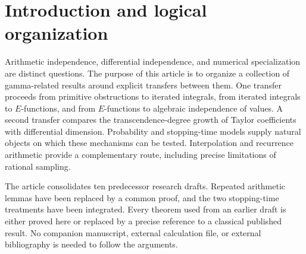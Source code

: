 \documentclass[11pt,a4paper]{article}
\theoremstyle{definition}
\theoremstyle{remark}
\numberwithin{equation}{section}
\begin{document}
\section{Introduction and logical organization}
\label{unified:introduction}
Arithmetic independence, differential independence, and numerical
specialization are distinct questions. The purpose of this article is
to organize a collection of gamma-related results around explicit
transfers between them. One transfer proceeds from primitive
obstructions to iterated integrals, from iterated integrals to
$E$-functions, and from $E$-functions to algebraic independence of
values. A second transfer compares the transcendence-degree growth of
Taylor coefficients with differential dimension. Probability and
stopping-time models supply natural objects on which these mechanisms
can be tested. Interpolation and recurrence arithmetic provide a
complementary route, including precise limitations of rational sampling.

The article consolidates ten predecessor research drafts. Repeated
arithmetic lemmas have been replaced by a common proof, and the two
stopping-time treatments have been integrated. Every theorem used from
an earlier draft is either proved here or replaced by a precise
reference to a classical published result. No companion manuscript,
external calculation file, or external bibliography is needed to
follow the arguments.
\end{document}

